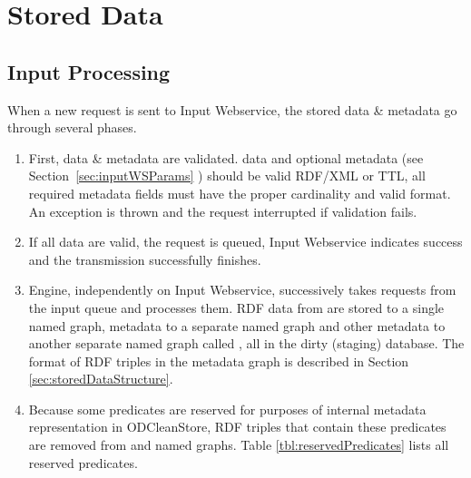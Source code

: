 

\chapter{Stored Data}
\section{Input Processing}
\label{sec:inputProcessing}
When a new request is sent to Input Webservice, the stored data \& metadata go through several phases.

\begin{enumerate}

  \item First, data \& metadata are validated.  data and optional  metadata (see Section~\ref{sec:inputWSParams} ) should be valid RDF/XML or TTL, all required metadata fields must have the proper cardinality and valid format. An exception is thrown and the request interrupted if validation fails.

  \item If all data are valid, the request is queued, Input Webservice indicates success and the transmission successfully finishes.

  \item Engine, independently on Input Webservice, successively takes requests from the input queue and processes them. RDF data from  are stored to a single named graph,  metadata to a separate named graph and other metadata to another separate named graph called , all in the dirty (staging) database. The format of RDF triples in the metadata graph is described in Section \ref{sec:storedDataStructure}.

  \item Because some predicates are reserved for purposes of internal metadata representation in ODCleanStore, RDF triples that contain these predicates are removed from  and  named graphs. Table \ref{tbl:reservedPredicates} lists all reserved predicates.


\end{enumerate}
